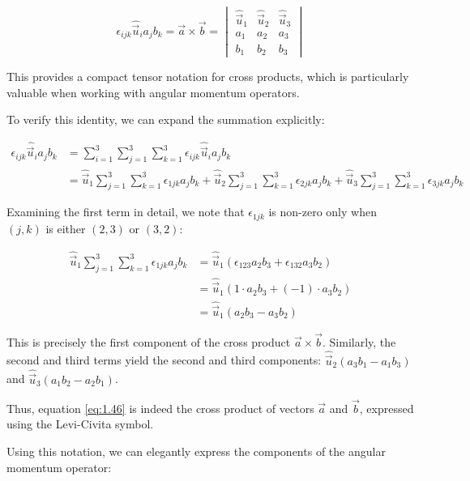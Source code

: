 \documentclass[italian]{HKNdocument}
\begin{document}
\[
\epsilon_{i j k} \hat{\vec{u}}_{i} a_{j} b_{k}=\vec{a} \times \vec{b}=\begin{vmatrix}
\hat{\vec{u}}_{1} & \hat{\vec{u}}_{2} & \hat{\vec{u}}_{3} \label{eq:1.46}\\
a_{1} & a_{2} & a_{3} \\
b_{1} & b_{2} & b_{3}
\end{vmatrix}
\]

This provides a compact tensor notation for cross products, which is particularly valuable when working with angular momentum operators.

To verify this identity, we can expand the summation explicitly:


\begin{align}
\epsilon_{i j k} \hat{\vec{u}}_{i} a_{j} b_{k} &= \sum_{i=1}^{3} \sum_{j=1}^{3} \sum_{k=1}^{3} \epsilon_{i j k} \hat{\vec{u}}_{i} a_{j} b_{k} \\
&= \hat{\vec{u}}_{1} \sum_{j=1}^{3} \sum_{k=1}^{3} \epsilon_{1 j k} a_{j} b_{k} + \hat{\vec{u}}_{2} \sum_{j=1}^{3} \sum_{k=1}^{3} \epsilon_{2 j k} a_{j} b_{k} + \hat{\vec{u}}_{3} \sum_{j=1}^{3} \sum_{k=1}^{3} \epsilon_{3 j k} a_{j} b_{k} \label{eq:1.47}
\end{align}

Examining the first term in detail, we note that $\epsilon_{1jk}$ is non-zero only when $(j,k)$ is either $(2,3)$ or $(3,2)$:

\begin{align}
\hat{\vec{u}}_{1} \sum_{j=1}^{3} \sum_{k=1}^{3} \epsilon_{1 j k} a_{j} b_{k} &= \hat{\vec{u}}_{1}(\epsilon_{123} a_{2} b_{3} + \epsilon_{132} a_{3} b_{2}) \label{eq:1.48} \\
&= \hat{\vec{u}}_{1}(1 \cdot a_{2} b_{3} + (-1) \cdot a_{3} b_{2}) \\
&= \hat{\vec{u}}_{1}(a_{2} b_{3} - a_{3} b_{2})
\end{align}

This is precisely the first component of the cross product $\vec{a} \times \vec{b}$. Similarly, the second and third terms yield the second and third components:
$\hat{\vec{u}}_{2}(a_{3} b_{1} - a_{1} b_{3})$ and $\hat{\vec{u}}_{3}(a_{1} b_{2} - a_{2} b_{1})$.

Thus, equation \eqref{eq:1.46} is indeed the cross product of vectors $\vec{a}$ and $\vec{b}$, expressed using the Levi-Civita symbol.

Using this notation, we can elegantly express the components of the angular momentum operator:
\end{document}

